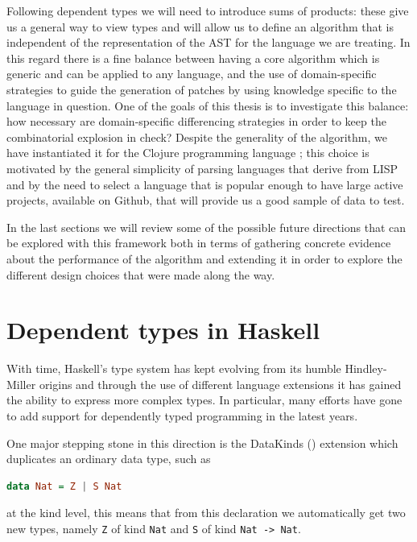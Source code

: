 \documentclass[11pt]{article}
\begin{document}
 Following dependent types we will need to introduce sums of products: these give us a general way to view 
types and will allow us to define an algorithm that is independent of the representation of the AST for the language 
we are treating. In this regard there is a fine balance between having a core algorithm which is generic and can 
be applied to any language, and the use of domain-specific strategies to guide the generation of patches by using 
knowledge specific to the language in question. One of the goals of this thesis is to investigate this balance: 
how necessary are domain-specific differencing strategies in order to keep the combinatorial explosion in check? 
Despite the generality of the algorithm, we have instantiated it for the Clojure programming language 
\cite{clojure}; this choice is motivated by the general simplicity of parsing languages that derive from 
LISP and by the need to select a language that is popular enough to have large 
active projects, available on Github, that will provide us a good sample of data 
to test.

In the last sections we will review some of the possible 
future directions that can be explored with this framework both in terms of 
gathering concrete evidence about the performance of the algorithm and extending 
it in order to explore the different design choices that were made along the way.

\section{Dependent types in
Haskell}\label{dependent-types-in-haskell}

With time, Haskell's type system has kept evolving from its humble
Hindley-Miller origins and through the use of different language extensions it has gained the ability 
to express more complex types. In particular, many efforts have gone to add support for dependently
typed programming in the latest years.

One major stepping stone in this direction is the DataKinds (\cite{datakinds}) extension which duplicates an ordinary data type, such as

\begin{lstlisting}[language=haskell]
data Nat = Z | S Nat
\end{lstlisting}

at the kind level, this means that from this declaration we automatically get two new types, namely \texttt{Z} of kind \texttt{Nat}
and \texttt{S} of kind \texttt{Nat\ -\textgreater{}\ Nat}.
\end{document}
